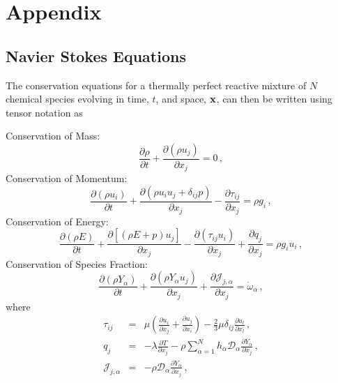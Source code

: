 \section{Appendix} 
\setcounter{equation}{0}
\subsection{Navier Stokes Equations} \label{section:Navier}
The conservation equations
for a thermally perfect reactive mixture of $N$ chemical species
evolving in time, $t$, and space, $\mathbf{x}$, can then be written
using tensor notation as \cite{HPerez:2011}\par
%
\indent Conservation of Mass:
\begin{equation}
  \label{eq:mass}
  \frac{\partial \rho}{\partial t} 
  + \frac{\partial (\rho u_j)}{\partial x_j}  =  0 \,,
\end{equation}
%
\indent Conservation of Momentum:
\begin{equation}
  \label{eq:momentum} 
  \frac{\partial (\rho u_i)}{\partial t} 
  + \frac{\partial (\rho u_i u_j + \delta_{ij} p)}{\partial x_j}  
  - \frac{\partial \tau_{ij}}{\partial x_j}
  =  \rho g_i \,, 
\end{equation}
%
\indent Conservation of Energy:
\begin{equation}
  \label{eq:energy}
  \frac{\partial (\rho E)}{\partial t} 
  + \frac{\partial [(\rho E + p) u_j]}{\partial x_j} 
  - \frac{\partial (\tau_{ij} u_i)}{\partial x_j} 
  + \frac{\partial q_j}{\partial x_j}
  =  \rho g_i u_i \,,  
\end{equation}
%
\indent Conservation of Species Fraction:
\begin{equation}
  \label{eq:species}
  \frac{\partial (\rho Y_\alpha)}{\partial t} 
  + \frac{\partial (\rho Y_\alpha u_j)}{\partial x_j}
  + \frac{\partial \mathcal{J}_{j,\alpha} }{\partial{x_j}} 
  =  \dot{\omega}_{\alpha} \,, 
\end{equation}
%
where
%
\begin{eqnarray}
  \label{eq:stress_tensor}
  \tau_{ij} & = & \mu \left( \frac{\partial u_i}{\partial x_j} 
  + \frac{\partial u_j}{\partial x_i} \right) 
  - \frac{2}{3} \mu \delta_{ij} \frac{\partial u_l}{\partial x_l} \,,  \\
  \label{eq:heat_flux}
  q_j & = & - \lambda \frac{\partial T}{\partial x_j} 
  - \rho \sum_{\alpha=1}^N h_\alpha\mathcal{D}_\alpha \frac{\partial Y_\alpha}{\partial x_j}  \,, \\
  \label{eq:species_diffusive_flux}
  \mathcal{J}_{j,\alpha} & = & - \rho \mathcal{D}_\alpha \frac{\partial Y_\alpha}{\partial x_j} \,,  
\end{eqnarray}
%



